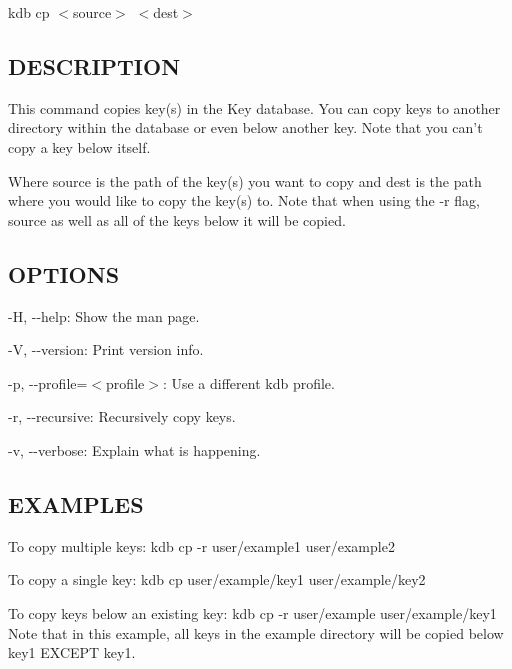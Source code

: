 {\ttfamily kdb cp $<$source$>$ $<$dest$>$}

\subsection*{D\+E\+S\+C\+R\+I\+P\+T\+I\+O\+N}

This command copies key(s) in the Key database. You can copy keys to another directory within the database or even below another key. Note that you can't copy a key below itself.

Where {\ttfamily source} is the path of the key(s) you want to copy and {\ttfamily dest} is the path where you would like to copy the key(s) to. Note that when using the {\ttfamily -\/r} flag, {\ttfamily source} as well as all of the keys below it will be copied.

\subsection*{O\+P\+T\+I\+O\+N\+S}


\begin{DoxyItemize}
\item {\ttfamily -\/\+H}, {\ttfamily -\/-\/help}\+: Show the man page.
\item {\ttfamily -\/\+V}, {\ttfamily -\/-\/version}\+: Print version info.
\item {\ttfamily -\/p}, {\ttfamily -\/-\/profile}=$<$profile$>$\+: Use a different kdb profile.
\item {\ttfamily -\/r}, {\ttfamily -\/-\/recursive}\+: Recursively copy keys.
\item {\ttfamily -\/v}, {\ttfamily -\/-\/verbose}\+: Explain what is happening.
\end{DoxyItemize}

\subsection*{E\+X\+A\+M\+P\+L\+E\+S}

To copy multiple keys\+: {\ttfamily kdb cp -\/r user/example1 user/example2}

To copy a single key\+: {\ttfamily kdb cp user/example/key1 user/example/key2}

To copy keys below an existing key\+: {\ttfamily kdb cp -\/r user/example user/example/key1} Note that in this example, all keys in the example directory will be copied below {\ttfamily key1} E\+X\+C\+E\+P\+T {\ttfamily key1}. 